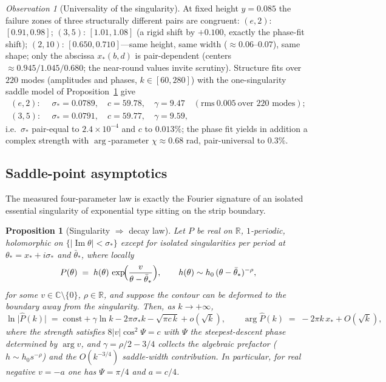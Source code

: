 \documentclass[11pt,a4paper]{article}
\newtheorem{proposition}[theorem]{Proposition}
\theoremstyle{definition}
\theoremstyle{remark}
\newtheorem{observation}[theorem]{Observation}
\newcommand{\R}{\mathbb{R}}
\begin{document}
\begin{observation}[Universality of the singularity]\label{obs:universal}
At fixed height $y=0.085$ the failure zones of three structurally different pairs are
congruent: $(e,2)$: $[0.91,0.98]$; $(3,5)$: $[1.01,1.08]$ (a rigid shift by $+0.100$, exactly
the phase-fit shift); $(2,10)$: $[0.650,0.710]$---same height, same width
($\approx0.06$--$0.07$), same shape; only the abscissa $x_*(b,d)$ is pair-dependent
(centers $\approx0.945/1.045/0.680$; the near-round values invite scrutiny). Structure fits
over $220$ modes (amplitudes and phases, $k\in[60,280]$) with the one-singularity saddle
model of Proposition~\ref{prop:saddle} give
\begin{align*}
(e,2):&\ \ \sigma_*=0.0789,\quad c=59.78,\quad \gamma=9.47\quad(\mathrm{rms}\ 0.005\ \text{over
220 modes});\\
(3,5):&\ \ \sigma_*=0.0791,\quad c=59.77,\quad \gamma=9.59,
\end{align*}
i.e.\ $\sigma_*$ pair-equal to $2.4\times10^{-4}$ and $c$ to $0.013\%$; the phase fit yields
in addition a complex strength with $\arg$-parameter $\chi\approx0.68$ rad, pair-universal to
$0.3\%$.
\end{observation}

\subsection{Saddle-point asymptotics}

The measured four-parameter law is exactly the Fourier signature of an isolated essential
singularity of exponential type sitting on the strip boundary.

\begin{proposition}[Singularity $\Rightarrow$ decay law]\label{prop:saddle}
Let $P$ be real on $\R$, $1$-periodic, holomorphic on
$\{\lvert\operatorname{Im}\theta\rvert<\sigma_*\}$ except for isolated singularities per
period at $\theta_*=x_*+i\sigma_*$ and $\bar\theta_*$, where locally
\[
P(\theta)\;=\;h(\theta)\,\exp\!\Bigl(\frac{v}{\theta-\bar\theta_*}\Bigr),\qquad
h(\theta)\sim h_0\,(\theta-\bar\theta_*)^{-\rho},
\]
for some $v\in\mathbb C\setminus\{0\}$, $\rho\in\R$, and suppose the contour can be deformed
to the boundary away from the singularity. Then, as $k\to+\infty$,
\[
\ln\bigl|\widehat P(k)\bigr|\;=\;\mathrm{const}+\gamma\ln k-2\pi\sigma_*k-\sqrt{\pi c\,k}
+o(\sqrt k),
\qquad
\arg\widehat P(k)\;=\;-2\pi k\,x_*+O(\sqrt k),
\]
where the strength satisfies $8\lvert v\rvert\cos^2\Psi=c$ with
$\Psi$ the steepest-descent phase determined by $\arg v$, and
$\gamma=\rho/2-3/4$ collects the algebraic prefactor ($h\sim h_0 s^{-\rho}$) and the
$O(k^{-3/4})$ saddle-width contribution. In particular, for real negative $v=-a$ one has
$\Psi=\pi/4$ and $a=c/4$.
\end{proposition}
\end{document}
